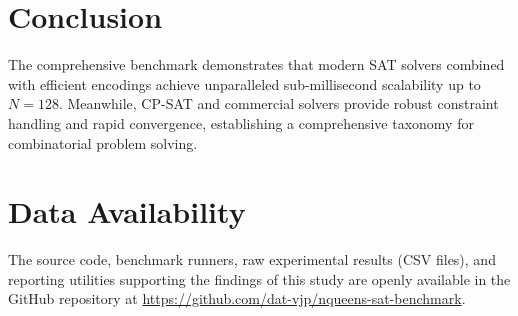 \documentclass[a4paper,fleqn]{cas-sc}
\begin{document}
\section{Conclusion}
The comprehensive benchmark demonstrates that modern SAT solvers combined with efficient encodings achieve unparalleled sub-millisecond scalability up to $N = 128$. Meanwhile, CP-SAT and commercial solvers provide robust constraint handling and rapid convergence, establishing a comprehensive taxonomy for combinatorial problem solving.

\section{Data Availability}
The source code, benchmark runners, raw experimental results (CSV files), and reporting utilities supporting the findings of this study are openly available in the GitHub repository at \url{https://github.com/dat-vjp/nqueens-sat-benchmark}.
\end{document}
